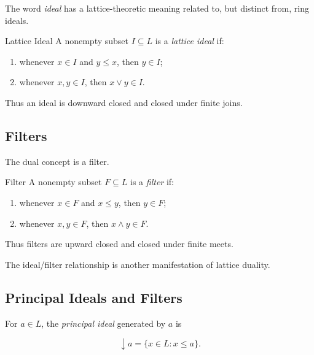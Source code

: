 The word \emph{ideal} has a lattice-theoretic meaning related to, but
distinct from, ring ideals.

\begin{definitionbox}{Lattice Ideal}
A nonempty subset \(I\subseteq L\) is a \emph{lattice ideal} if:
\begin{enumerate}
    \item whenever \(x\in I\) and \(y\leq x\), then \(y\in I\);
    \item whenever \(x,y\in I\), then \(x\vee y\in I\).
\end{enumerate}
\end{definitionbox}

Thus an ideal is downward closed and closed under finite joins.

\subsection{Filters}
\label{subsec:lattice-filters}

The dual concept is a filter.

\begin{definitionbox}{Filter}
A nonempty subset \(F\subseteq L\) is a \emph{filter} if:
\begin{enumerate}
    \item whenever \(x\in F\) and \(x\leq y\), then \(y\in F\);
    \item whenever \(x,y\in F\), then \(x\wedge y\in F\).
\end{enumerate}
\end{definitionbox}

Thus filters are upward closed and closed under finite meets.

The ideal/filter relationship is another manifestation of lattice duality.

\subsection{Principal Ideals and Filters}
\label{subsec:principal-lattice-ideals}

For \(a\in L\), the \emph{principal ideal} generated by \(a\) is

\[ \downarrow a=\{x\in L:x\leq a\}. \]

